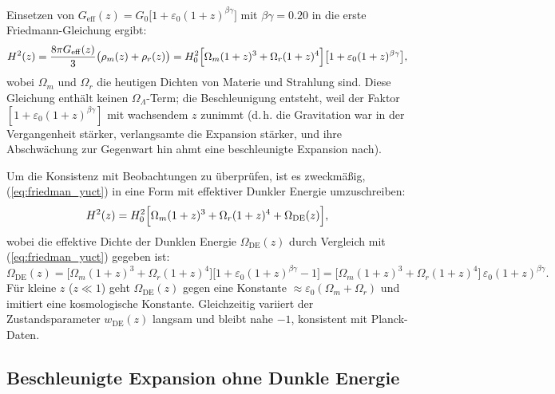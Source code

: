 \documentclass[12pt]{article}
\theoremstyle{remark}
\begin{document}
	Einsetzen von $G_{\mathrm{eff}}(z) = G_0\bigl[1 + \varepsilon_0 (1+z)^{\beta\gamma}\bigr]$ mit $\beta\gamma = 0.20$ in die erste Friedmann-Gleichung ergibt:
	\begin{equation}
		H^2(z) = \frac{8\pi G_{\mathrm{eff}}(z)}{3} \bigl(\rho_m(z) + \rho_r(z)\bigr) = H_0^2\Bigl[\Omega_m (1+z)^3 + \Omega_r (1+z)^4\Bigr]\bigl[1 + \varepsilon_0 (1+z)^{\beta\gamma}\bigr],
		\label{eq:friedman_yuct}
	\end{equation}
	wobei $\Omega_m$ und $\Omega_r$ die heutigen Dichten von Materie und Strahlung sind. Diese Gleichung enthält keinen $\Omega_\Lambda$-Term; die Beschleunigung entsteht, weil der Faktor $[1 + \varepsilon_0 (1+z)^{\beta\gamma}]$ mit wachsendem $z$ zunimmt (d. h. die Gravitation war in der Vergangenheit stärker, verlangsamte die Expansion stärker, und ihre Abschwächung zur Gegenwart hin ahmt eine beschleunigte Expansion nach).
	
	Um die Konsistenz mit Beobachtungen zu überprüfen, ist es zweckmäßig, (\ref{eq:friedman_yuct}) in eine Form mit effektiver Dunkler Energie umzuschreiben:
	\begin{equation}
		H^2(z) = H_0^2\Bigl[\Omega_m (1+z)^3 + \Omega_r (1+z)^4 + \Omega_{\mathrm{DE}}(z)\Bigr],
		\label{eq:effective_de}
	\end{equation}
	wobei die effektive Dichte der Dunklen Energie $\Omega_{\mathrm{DE}}(z)$ durch Vergleich mit (\ref{eq:friedman_yuct}) gegeben ist:
	\begin{equation}
		\Omega_{\mathrm{DE}}(z) = \bigl[\Omega_m (1+z)^3 + \Omega_r (1+z)^4\bigr]\bigl[1 + \varepsilon_0 (1+z)^{\beta\gamma} - 1\bigr] = \bigl[\Omega_m (1+z)^3 + \Omega_r (1+z)^4\bigr]\,\varepsilon_0 (1+z)^{\beta\gamma}.
		\label{eq:de_yuct}
	\end{equation}
	Für kleine $z$ ($z \ll 1$) geht $\Omega_{\mathrm{DE}}(z)$ gegen eine Konstante $\approx \varepsilon_0 (\Omega_m + \Omega_r)$ und imitiert eine kosmologische Konstante. Gleichzeitig variiert der Zustandsparameter $w_{\mathrm{DE}}(z)$ langsam und bleibt nahe $-1$, konsistent mit Planck-Daten.
	
	\subsection{Beschleunigte Expansion ohne Dunkle Energie}
	
\end{document}
